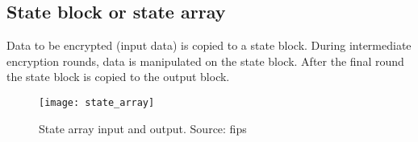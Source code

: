 \documentclass[report.tex]{subfiles}
\begin{document}
\subsection{State block or state array}
Data to be encrypted (input data) is copied to a state block. During intermediate encryption rounds, data is manipulated on the state block. After the final round the state block is copied to the output block.%

\begin{figure}[h]
\centering
\texttt{[image: state\_array]}
\caption{State array input and output. Source: fips}
\label{fig:state array}
\end{figure}
\end{document}
